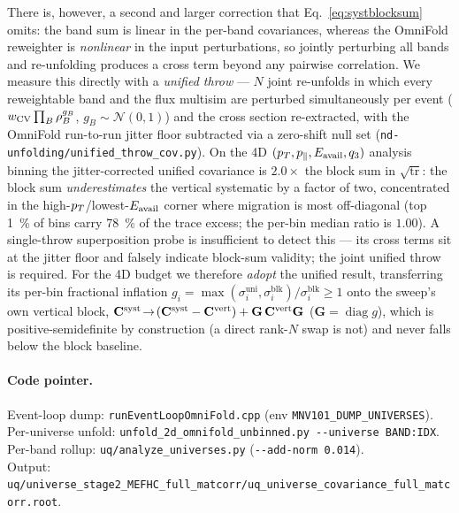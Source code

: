 There is, however, a second and larger correction that Eq.~\eqref{eq:systblocksum}
omits: the band sum is linear in the per-band covariances, whereas the OmniFold
reweighter is \emph{nonlinear} in the input perturbations, so jointly perturbing
all bands and re-unfolding produces a cross term beyond any pairwise correlation.
We measure this directly with a \emph{unified throw} --- $N$ joint re-unfolds in
which every reweightable band and the flux multisim are perturbed simultaneously
per event ($w_{\text{CV}}\prod_B\rho_B^{g_B}$, $g_B\sim\mathcal N(0,1)$) and the cross
section re-extracted, with the OmniFold run-to-run jitter floor subtracted via a
zero-shift null set (\texttt{nd-unfolding/unified\_throw\_cov.py}). On the 4D
$(p_{T},p_{\parallel},E_{\mathrm{avail}},q_3)$ analysis binning the jitter-corrected unified covariance
is $\mathbf{2.0\times}$ the block sum in $\sqrt{\operatorname{tr}}$: the block sum
\emph{underestimates} the vertical systematic by a factor of two, concentrated in
the high-$p_{T}$/lowest-$E_{\mathrm{avail}}$ corner where migration is most off-diagonal (top
\SI{1}{\percent} of bins carry \SI{78}{\percent} of the trace excess; the per-bin
median ratio is $1.00$). A single-throw superposition probe is insufficient to
detect this --- its cross terms sit at the jitter floor and falsely indicate
block-sum validity; the joint unified throw is required. For the 4D budget we
therefore \emph{adopt} the unified result,
transferring its per-bin fractional inflation
$g_i=\max(\sigma^{\mathrm{uni}}_i,\sigma^{\mathrm{blk}}_i)/\sigma^{\mathrm{blk}}_i\ge1$
onto the sweep's own vertical block,
$\mathbf{C}^{\text{syst}}\!\to\!(\mathbf{C}^{\text{syst}}-\mathbf{C}^{\mathrm{vert}})+\mathbf{G}\,\mathbf{C}^{\mathrm{vert}}\mathbf{G}$
($\mathbf{G}=\operatorname{diag}g$), which is positive-semidefinite by construction
(a direct rank-$N$ swap is not) and never falls below the block baseline.

\paragraph{Code pointer.}
Event-loop dump:
\texttt{runEventLoopOmniFold.cpp} (env \texttt{MNV101\_DUMP\_UNIVERSES}).\\
Per-universe unfold:
\texttt{unfold\_2d\_omnifold\_unbinned.py -{}-universe BAND:IDX}.\\
Per-band rollup: \texttt{uq/analyze\_universes.py} (\texttt{-{}-add-norm 0.014}).\\
Output:
\texttt{uq/universe\_stage2\_MEFHC\_full\_matcorr/uq\_universe\_covariance\_full\_matcorr.root}.

